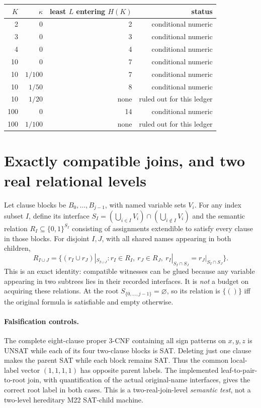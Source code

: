 \documentclass[11pt]{article}
\begin{document}
\begin{center}\small
\begin{tabular}{rrrr}
\toprule
$K$ & $\kappa$ & least $L$ entering $H(K)$ & status\\
\midrule
2 & 0 & 2 & conditional numeric\\
3 & 0 & 3 & conditional numeric\\
4 & 0 & 4 & conditional numeric\\
10 & 0 & 7 & conditional numeric\\
10 & $1/100$ & 7 & conditional numeric\\
10 & $1/50$ & 8 & conditional numeric\\
10 & $1/20$ & none & ruled out for this ledger\\
100 & 0 & 14 & conditional numeric\\
100 & $1/100$ & none & ruled out for this ledger\\
\bottomrule
\end{tabular}
\end{center}

\section{Exactly compatible joins, and two real relational levels}
Let clause blocks be $B_0,\dots,B_{j-1}$, with named variable sets
$V_i$. For any index subset $I$, define its interface
$S_I=(\bigcup_{i\in I}V_i)\cap(\bigcup_{i\notin I}V_i)$ and the
semantic relation $R_I\subseteq\{0,1\}^{S_I}$ consisting of
assignments extendible to satisfy every clause in those blocks.
For disjoint $I,J$, with all shared names appearing in both children,
\[
R_{I\cup J}=\{(r_I\cup r_J)|_{S_{I\cup J}}:
 r_I\in R_I,\ r_J\in R_J,\
 r_I|_{S_I\cap S_J}=r_J|_{S_I\cap S_J}\}.
\]
This is an exact identity: compatible witnesses can be glued because
any variable appearing in two subtrees lies in their recorded
interfaces. It is \emph{not} a budget on acquiring these relations.
At the root $S_{\{0,\ldots,j-1\}}=\varnothing$, so its relation
is $\{()\}$ iff the original formula is satisfiable and empty otherwise.

\paragraph{Falsification controls.}
The complete eight-clause proper 3-CNF containing all sign patterns on
$x,y,z$ is UNSAT while each of its four two-clause blocks is SAT.
Deleting just one clause makes the parent SAT while each block remains
SAT. Thus the common local-label vector $(1,1,1,1)$ has opposite
parent labels. The implemented leaf-to-pair-to-root join, with
quantification of the actual original-name interfaces, gives the
correct root label in both cases. This is a two-real-join-level
\emph{semantic test}, not a two-level hereditary M22 SAT-child machine.
\end{document}

